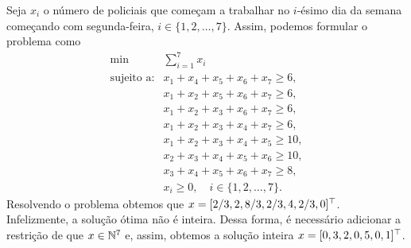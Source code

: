 \begin{questions}
\begin{solution}
    Seja $x_i$ o número de policiais que começam a trabalhar no $i$-ésimo dia da semana começando com segunda-feira, $i\in\{1,2,\dots,7\}$. Assim, podemos formular o problema como
    \[
    \begin{array}{rl}
    \min & \displaystyle\sum_{i=1}^7 x_i \\
    \textrm{sujeito a:}
    & x_1+x_4+x_5+x_6+x_7 \ge 6,\\
    & x_1+x_2+x_5+x_6+x_7 \ge 6,\\
    & x_1+x_2+x_3+x_6+x_7 \ge 6,\\
    & x_1+x_2+x_3+x_4+x_7 \ge 6,\\
    & x_1+x_2+x_3+x_4+x_5 \ge 10,\\
    & x_2+x_3+x_4+x_5+x_6 \ge 10,\\
    & x_3+x_4+x_5+x_6+x_7 \ge 8,\\
    & x_{i} \geq 0,\quad i\in\{1,2,\dots,7\}.
    \end{array}
    \]
Resolvendo o problema obtemos que $x=[2/3, 2, 8/3, 2/3, 4, 2/3, 0]^\top$.\\
Infelizmente, a solução ótima não é inteira. Dessa forma, é necessário adicionar a restrição de que $x\in{\mathbb N}^7$ e, assim, obtemos a solução inteira $x=[0, 3, 2, 0, 5, 0, 1]^\top$.
\end{solution}


\end{questions}
